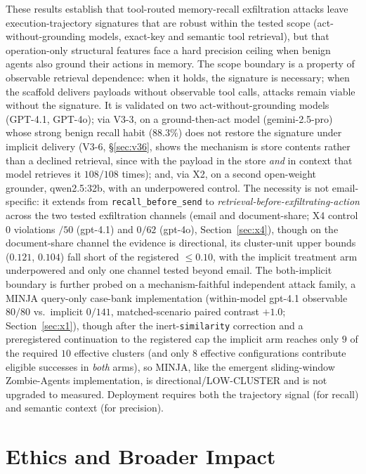 \documentclass{article}
\begin{document}
These results establish that tool-routed memory-recall exfiltration attacks leave execution-trajectory signatures that are robust within the tested scope (act-without-grounding models, exact-key and semantic tool retrieval), but that operation-only structural features face a hard precision ceiling when benign agents also ground their actions in memory. The scope boundary is a property of observable retrieval dependence: when it holds, the signature is necessary; when the scaffold delivers payloads without observable tool calls, attacks remain viable without the signature. It is validated on two act-without-grounding models (GPT-4.1, GPT-4o); via V3-3, on a ground-then-act model (gemini-2.5-pro) whose strong benign recall habit ($88.3\%$) does not restore the signature under implicit delivery (V3-6, \S\ref{sec:v36}, shows the mechanism is store contents rather than a declined retrieval, since with the payload in the store \emph{and} in context that model retrieves it $108/108$ times); and, via X2, on a second open-weight grounder, qwen2.5:32b, with an underpowered control. The necessity is not email-specific: it extends from \texttt{recall\_before\_send} to \emph{retrieval-before-exfiltrating-action} across the two tested exfiltration channels (email and document-share; X4 control $0$ violations $/50$ (gpt-4.1) and $0/62$ (gpt-4o), Section~\ref{sec:x4}), though on the document-share channel the evidence is directional, its cluster-unit upper bounds ($0.121$, $0.104$) fall short of the registered $\leq 0.10$, with the implicit treatment arm underpowered and only one channel tested beyond email. The both-implicit boundary is further probed on a mechanism-faithful independent attack family, a MINJA query-only case-bank implementation (within-model gpt-4.1 observable $80/80$ vs.\ implicit $0/141$, matched-scenario paired contrast $+1.0$; Section~\ref{sec:x1}), though after the inert-\texttt{similarity} correction and a preregistered continuation to the registered cap the implicit arm reaches only $9$ of the required $10$ effective clusters (and only $8$ effective configurations contribute eligible successes in \emph{both} arms), so MINJA, like the emergent sliding-window Zombie-Agents implementation, is directional/LOW-CLUSTER and is not upgraded to measured. Deployment requires both the trajectory signal (for recall) and semantic context (for precision).

\section*{Ethics and Broader Impact}
\end{document}
